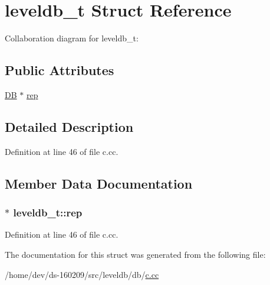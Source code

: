\hypertarget{structleveldb__t}{}\section{leveldb\+\_\+t Struct Reference}
\label{structleveldb__t}


Collaboration diagram for leveldb\+\_\+t\+:
\subsection*{Public Attributes}
\begin{DoxyCompactItemize}
\item 
\hyperlink{classleveldb_1_1_d_b}{D\+B} $\ast$ \hyperlink{structleveldb__t_af8f1950b2c676ccc37e4095f558261ad}{rep}
\end{DoxyCompactItemize}


\subsection{Detailed Description}


Definition at line 46 of file c.\+cc.



\subsection{Member Data Documentation}
\hypertarget{structleveldb__t_af8f1950b2c676ccc37e4095f558261ad}{}
\subsubsection[{rep}]{$\ast$ leveldb\+\_\+t\+::rep}\label{structleveldb__t_af8f1950b2c676ccc37e4095f558261ad}


Definition at line 46 of file c.\+cc.



The documentation for this struct was generated from the following file\+:\begin{DoxyCompactItemize}
\item 
/home/dev/ds-\/160209/src/leveldb/db/\hyperlink{c_8cc}{c.\+cc}\end{DoxyCompactItemize}
